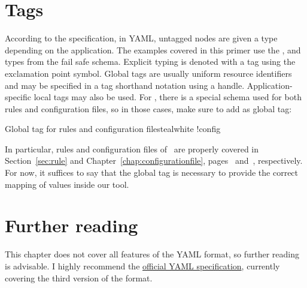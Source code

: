 \section{Tags}
\label{sec:yamltags}

According to the specification, in YAML, untagged nodes are given a type depending on the application. The examples covered in this primer use the ,  and  types from the fail safe schema. Explicit typing is denoted with a tag using the exclamation point symbol. Global tags are usually uniform resource identifiers and may be specified in a tag shorthand notation using a handle. Application-specific local tags may also be used. For \arara, there is a special schema used for both rules and configuration files, so in those cases, make sure to add  as global tag:

\begin{codebox}{Global tag for rules and configuration files}{teal}{\icnote}{white}
!config
\end{codebox}

In particular, rules and configuration files of \arara\ are properly covered in Section~\ref{sec:rule} and Chapter~\ref{chap:configurationfile}, pages~\pageref{sec:rule} and~\pageref{chap:configurationfile}, respectively. For now, it suffices to say that the  global tag is necessary to provide the correct mapping of values inside our tool.

\section{Further reading}
\label{sec:yamlfurtherreading}

This chapter does not cover all features of the YAML format, so further reading is advisable. I highly recommend the \href{http://yaml.org/spec/1.2/spec.html}{official YAML specification}, currently covering the third version of the format.
